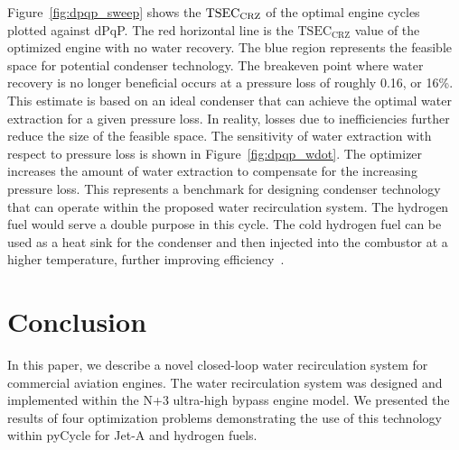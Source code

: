 \documentclass[conf]{new-aiaa}
\begin{document}
Figure~\ref{fig:dpqp_sweep} shows the $\rm{TSEC}_{\rm{CRZ}}$ of the optimal engine cycles plotted against dPqP.
The red horizontal line is the $\text{TSEC}_\text{CRZ}$ value of the optimized engine with no water recovery.
The blue region represents the feasible space for potential condenser technology.
The breakeven point where water recovery is no longer beneficial occurs at a pressure loss of roughly 0.16, or 16\%.
This estimate is based on an ideal condenser that can achieve the optimal water extraction for a given pressure loss.
In reality, losses due to inefficiencies further reduce the size of the feasible space.
The sensitivity of water extraction with respect to pressure loss is shown in Figure~\ref{fig:dpqp_wdot}.
The optimizer increases the amount of water extraction to compensate for the increasing pressure loss.
This represents a benchmark for designing condenser technology that can operate within the proposed water recirculation system.
The hydrogen fuel would serve a double purpose in this cycle.
The cold hydrogen fuel can be used as a heat sink for the condenser and then injected into the combustor at a higher temperature, further improving efficiency~\cite{Boggia2002}.

\section{Conclusion}
\label{sec:conc}
In this paper, we describe a novel closed-loop water recirculation system for commercial aviation engines.
The water recirculation system was designed and implemented within the N+3 ultra-high bypass engine model.
We presented the results of four optimization problems demonstrating the use of this technology within pyCycle for Jet-A and hydrogen fuels.
\end{document}
